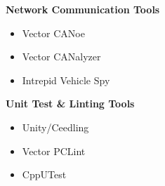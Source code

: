 \begin{minipage}[t]{0.48\textwidth}
\textbf{Network Communication Tools}
\begin{itemize}[leftmargin=*,noitemsep,topsep=0pt]
    \item Vector CANoe 
    \item Vector CANalyzer 
    \item Intrepid Vehicle Spy 
\end{itemize}

\vspace{0.5em}

\textbf{Unit Test \& Linting Tools}
\begin{itemize}[leftmargin=*,noitemsep,topsep=0pt]
    \item Unity/Ceedling 
    \item Vector PCLint 
    \item CppUTest 
\end{itemize}
\end{minipage}